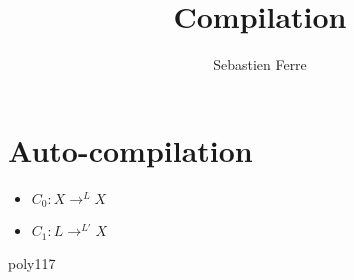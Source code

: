 \documentclass[10pt,a4paper]{report}
\author[1]{Sebastien Ferre}
\affil[1]{Sebastien.Ferre@irisa.fr}
\title{Compilation}
\begin{document}
\maketitle

\section{Auto-compilation}

\begin{itemize}
\item $C_0 : X \longrightarrow^L X$
\item $C_1 : L \longrightarrow^{L'} X$

\end{itemize}

poly117
\end{document}

